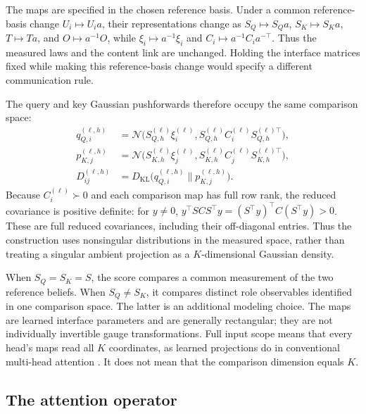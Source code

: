 \documentclass[twoside,11pt]{article}
\begin{document}
The maps are specified in the chosen reference basis. Under a common reference-basis change \(U_i\mapsto U_i a\), their representations change as \(S_Q\mapsto S_Qa\), \(S_K\mapsto S_Ka\), \(T\mapsto Ta\), and \(O\mapsto a^{-1}O\), while \(\xi_i\mapsto a^{-1}\xi_i\) and \(C_i\mapsto a^{-1}C_i a^{-\top}\). Thus the measured laws and the content link are unchanged. Holding the interface matrices fixed while making this reference-basis change would specify a different communication rule.

The query and key Gaussian pushforwards therefore occupy the same comparison space:
\begin{align}
q_{Q,i}^{(\ell,h)}
&=\mathcal N\bigl(S_{Q,h}^{(\ell)}\xi_i^{(\ell)},
 S_{Q,h}^{(\ell)}C_i^{(\ell)}S_{Q,h}^{(\ell)\top}\bigr),\label{eq:relational_query_law}\\
p_{K,j}^{(\ell,h)}
&=\mathcal N\bigl(S_{K,h}^{(\ell)}\xi_j^{(\ell)},
 S_{K,h}^{(\ell)}C_j^{(\ell)}S_{K,h}^{(\ell)\top}\bigr),\label{eq:relational_key_law}\\
D_{ij}^{(\ell,h)}
&=D_{\mathrm{KL}}\bigl(q_{Q,i}^{(\ell,h)}\|p_{K,j}^{(\ell,h)}\bigr).
\label{eq:relational_role_kl}
\end{align}
Because $C_i^{(\ell)}\succ0$ and each comparison map has full row rank, the reduced covariance is positive definite: for $y\ne0$, $y^\top SCS^\top y=(S^\top y)^\top C(S^\top y)>0$. These are full reduced covariances, including their off-diagonal entries. Thus the construction uses nonsingular distributions in the measured space, rather than treating a singular ambient projection as a $K$-dimensional Gaussian density.

When $S_Q=S_K=S$, the score compares a common measurement of the two reference beliefs. When $S_Q\ne S_K$, it compares distinct role observables identified in one comparison space. The latter is an additional modeling choice. The maps are learned interface parameters and are generally rectangular; they are not individually invertible gauge transformations. Full input scope means that every head's maps read all $K$ coordinates, as learned projections do in conventional multi-head attention \citep{vaswani2017attention}. It does not mean that the comparison dimension equals $K$.

\subsection{The attention operator}
\label{sec:attention_operator}
\label{sec:relational_communication}
\end{document}
